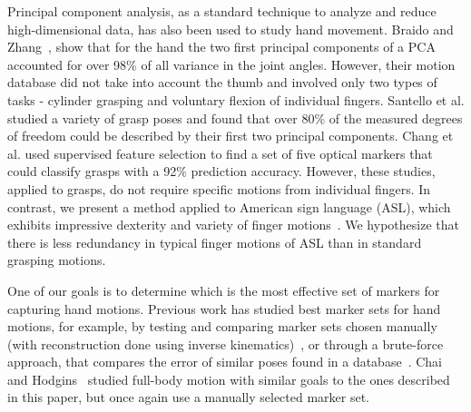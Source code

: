Principal component analysis, as a standard technique to analyze and reduce high-dimensional data, has also been used to study hand movement. Braido and Zhang~, show that for the hand the two first principal components of a PCA accounted for over 98\% of all variance in the joint angles. However, their motion database did not take into account the thumb and involved only two types of tasks - cylinder grasping and voluntary flexion of individual fingers. Santello et al.  studied a variety of grasp poses and found that over 80\% of the measured degrees of freedom could be described by their first two principal components. Chang et al.  used supervised feature selection to find a set of five optical markers that could classify grasps with a 92\% prediction accuracy. However, these studies, applied to grasps, do not require specific motions from individual fingers. In contrast, we present a method applied to American sign language (ASL), which exhibits impressive dexterity and variety of finger motions~\cite{CouGib10}. We hypothesize that there is less redundancy in typical finger motions of ASL than in standard grasping motions. 

One of our goals is to determine which is the most effective set of markers for capturing hand motions. Previous work has studied best marker sets for hand motions, for example,  by testing and comparing marker sets chosen manually (with reconstruction done using inverse kinematics)~\cite{HoyRyaOSu11}, or through a brute-force approach, that compares the error of similar poses found in a database~\cite{KanWheZor12}.  Chai and Hodgins~ studied full-body motion with similar goals to the ones described in this paper, but once again use a manually selected marker set.  




